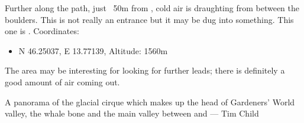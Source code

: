Further along the path, just ~50m from , cold air is draughting from between the boulders. This is not really an entrance but it may be dug into something. This one is . Coordinates:

\begin{itemize}
	\item N 46.25037, E 13.77139,  Altitude: 1560m
\end{itemize}

The area may be interesting for looking for further leads; there is definitely a good amount of air coming out.


\begin{pagefigure}
      \checkoddpage \ifoddpage \forcerectofloat \else \forceversofloat \fi
      \centering
       \label{Panorama}
  \caption{ A  panorama of the glacial cirque which makes up the head of Gardeners' World valley, the whale bone and the main valley between  and  --- Tim Child }
\end{pagefigure}
